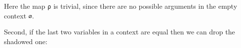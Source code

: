 Here the map \texttt{ρ} is trivial, since there are no possible
arguments in the empty context \texttt{∅}.

Second, if the last two variables in a context are equal then we can
drop the shadowed one:

\begin{fence}
\begin{code}%
\>[0]\AgdaSpace{}%
\AgdaSymbol{:}\AgdaSpace{}%
\AgdaSpace{}%
\AgdaSymbol{\{}\AgdaSpace{}%
\AgdaSpace{}%
\AgdaSpace{}%
\AgdaSpace{}%
\AgdaSpace{}%
\AgdaSymbol{\}}\<%
\\
\>[0][@{}l@{\AgdaIndent{0}}]%
\>[2]%
\>[539I]\AgdaSpace{}%
\AgdaOperator{\AgdaInductiveConstructor{,}}\AgdaSpace{}%
\AgdaSpace{}%
\AgdaSpace{}%
\AgdaSpace{}%
\AgdaOperator{\AgdaInductiveConstructor{,}}\AgdaSpace{}%
\AgdaSpace{}%
\AgdaSpace{}%
\AgdaSpace{}%
\AgdaSpace{}%
\AgdaSpace{}%
\AgdaSpace{}%
\<%
\\
\>[.][@{}l@{}]\<[539I]%
\>[4]\AgdaComment{--------------------------}\<%
\\
%
\>[2]\AgdaSpace{}%
\AgdaSpace{}%
\AgdaOperator{\AgdaInductiveConstructor{,}}\AgdaSpace{}%
\AgdaSpace{}%
\AgdaSpace{}%
\AgdaSpace{}%
\AgdaSpace{}%
\AgdaSpace{}%
\AgdaSpace{}%
\<%
\\
\>[0]\AgdaSpace{}%
\AgdaSymbol{\{}\AgdaSymbol{\}}\AgdaSpace{}%
\AgdaSymbol{\{}\AgdaSymbol{\}}\AgdaSpace{}%
\AgdaSymbol{\{}\AgdaSymbol{\}}\AgdaSpace{}%
\AgdaSymbol{\{}\AgdaSymbol{\}}\AgdaSpace{}%
\AgdaSymbol{\{}\AgdaSymbol{\}}\AgdaSpace{}%
\AgdaSymbol{\{}\AgdaSymbol{\}}\AgdaSpace{}%
\AgdaSpace{}%
\AgdaSymbol{=}\AgdaSpace{}%
\AgdaSpace{}%
\AgdaSpace{}%
\<%
\\
\>[0][@{}l@{\AgdaIndent{0}}]%
\>[2]\<%
\\
%
\>[2]%
\>[572I]\AgdaSymbol{:}\AgdaSpace{}%
\AgdaSpace{}%
\AgdaSymbol{\{}\AgdaSpace{}%

\end{code}
\end{fence}
